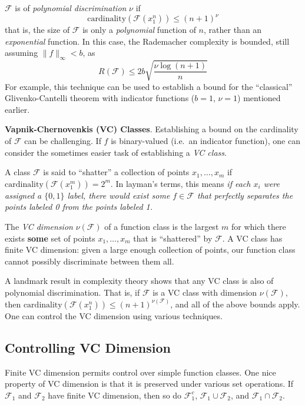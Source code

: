 \documentclass[
]{article}
\begin{document}
\(\mathscr{F}\) is of \emph{polynomial discrimination} \(\nu\)
if\[\text{cardinality}(\mathscr{F}(x_1^n)) \leq (n + 1)^\nu\]that is,
the size of \(\mathscr{F}\) is only a \emph{polynomial} function of
\(n\), rather than an \emph{exponential} function. In this case, the
Rademacher complexity is bounded, still assuming
\(\lVert f \rVert_\infty < b\), as
\[R(\mathscr{F}) \leq 2b\sqrt{\frac{\nu \log(n + 1)}{n}}\] For example,
this technique can be used to establish a bound for the ``classical''
Glivenko-Cantelli theorem with indicator functions (\(b = 1\),
\(\nu = 1\)) mentioned earlier.

\textbf{Vapnik-Chernovenkis (VC) Classes}. Establishing a bound on the
cardinality of \(\mathscr{F}\) can be challenging. If \(f\) is
binary-valued (i.e.~an indicator function), one can consider the
sometimes easier task of establishing a \emph{VC class}.

A class \(\mathscr{F}\) is said to ``shatter'' a collection of points
\(x_1, \ldots, x_m\) if
\(\text{cardinality}(\mathscr{F}(x_1^m)) = 2^m\). In layman's terms,
this means \emph{if each \(x_i\) were assigned a \(\{0, 1\}\) label,
there would exist some \(f \in \mathscr{F}\) that perfectly separates
the points labeled 0 from the points labeled 1.}

The \emph{VC dimension} \(\nu(\mathscr{F})\) of a function class is the
largest \(m\) for which there exists \textbf{some} set of points
\(x_1, \ldots, x_m\) that is ``shattered'' by \(\mathcal{F}\). A VC
class has finite VC dimension: given a large enough collection of
points, our function class cannot possibly discriminate between them
all.

A landmark result in complexity theory shows that any VC class is also
of polynomial discrimination. That is, if \(\mathscr{F}\) is a VC class
with dimension \(\nu(\mathcal{F})\), then
\(\text{cardinality}(\mathscr{F}(x_1^n)) \leq (n + 1)^{\nu(\mathcal{F})}\),
and all of the above bounds apply. One can control the VC dimension
using various techniques.

\hypertarget{controlling-vc-dimension}{%
\subsection{Controlling VC Dimension}\label{controlling-vc-dimension}}

Finite VC dimension permits control over simple function classes. One
nice property of VC dimension is that it is preserved under various set
operations. If \(\mathscr{F}_1\) and \(\mathscr{F}_2\) have finite VC
dimension, then so do \(\mathscr{F}_1^c\),
\(\mathscr{F}_1 \cup \mathscr{F}_2\), and
\(\mathscr{F}_1 \cap \mathscr{F}_2\).
\end{document}
